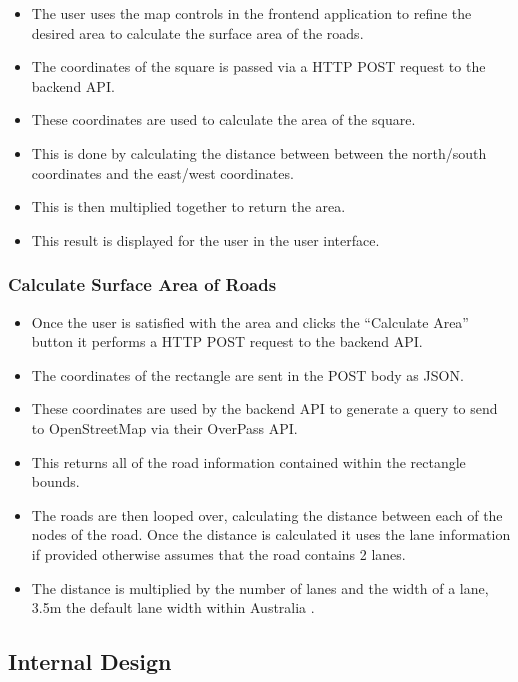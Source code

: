 \documentclass[a4paper,11pt]{article}
\begin{document}
\begin{itemize}
  \item The user uses the map controls in the frontend application to refine
    the desired area to calculate the surface area of the roads.
  \item The coordinates of the square is passed via a HTTP POST request to
    the backend API.\@
  \item These coordinates are used to calculate the area of the square.
  \item This is done by calculating the distance between between the
    north/south coordinates and the east/west coordinates.
  \item This is then multiplied together to return the area.
  \item This result is displayed for the user in the user interface.
\end{itemize}

\subsubsection{Calculate Surface Area of Roads}

\begin{itemize}
  \item Once the user is satisfied with the area and clicks the ``Calculate
    Area'' button it performs a HTTP POST request to the backend API.\@
  \item The coordinates of the rectangle are sent in the POST body as JSON.\@
  \item These coordinates are used by the backend API to generate a query to
    send to OpenStreetMap via their OverPass API.\@
  \item This returns all of the road information contained within the rectangle
    bounds.
  \item The roads are then looped over, calculating the distance between each of
    the nodes of the road. Once the distance is calculated it uses the lane
    information if provided otherwise assumes that the road contains 2 lanes.
  \item The distance is multiplied by the number of lanes and the width of a
    lane, 3.5m the default lane width within Australia \autocite{lane:11}.
\end{itemize}

\subsection{Internal Design}
\end{document}

